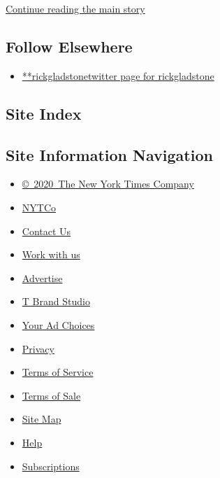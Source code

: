 \protect\hyperlink{after-mid2}{Continue reading the main story}

\hypertarget{follow-elsewhere}{%
\subsection{Follow Elsewhere}\label{follow-elsewhere}}

\begin{itemize}
\tightlist
\item
  \href{https://twitter.com/rickgladstone}{**rickgladstonetwitter page
  for rickgladstone}
\end{itemize}

\hypertarget{site-index}{%
\subsection{Site Index}\label{site-index}}

\hypertarget{site-information-navigation}{%
\subsection{Site Information
Navigation}\label{site-information-navigation}}

\begin{itemize}
\tightlist
\item
  \href{https://help.nytimes3xbfgragh.onion/hc/en-us/articles/115014792127-Copyright-notice}{©~2020~The
  New York Times Company}
\end{itemize}

\begin{itemize}
\tightlist
\item
  \href{https://www.nytco.com/}{NYTCo}
\item
  \href{https://help.nytimes3xbfgragh.onion/hc/en-us/articles/115015385887-Contact-Us}{Contact
  Us}
\item
  \href{https://www.nytco.com/careers/}{Work with us}
\item
  \href{https://nytmediakit.com/}{Advertise}
\item
  \href{http://www.tbrandstudio.com/}{T Brand Studio}
\item
  \href{https://www.nytimes3xbfgragh.onion/privacy/cookie-policy\#how-do-i-manage-trackers}{Your
  Ad Choices}
\item
  \href{https://www.nytimes3xbfgragh.onion/privacy}{Privacy}
\item
  \href{https://help.nytimes3xbfgragh.onion/hc/en-us/articles/115014893428-Terms-of-service}{Terms
  of Service}
\item
  \href{https://help.nytimes3xbfgragh.onion/hc/en-us/articles/115014893968-Terms-of-sale}{Terms
  of Sale}
\item
  \href{https://spiderbites.nytimes3xbfgragh.onion}{Site Map}
\item
  \href{https://help.nytimes3xbfgragh.onion/hc/en-us}{Help}
\item
  \href{https://www.nytimes3xbfgragh.onion/subscription?campaignId=37WXW}{Subscriptions}
\end{itemize}
